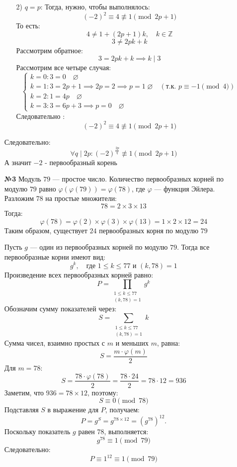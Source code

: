 \documentclass[a4paper]{article}
\renewcommand{\f}[2]{\frac{#1}{#2}}
\newcommand{\case}[1]{\begin{cases} #1 \end{cases}}
\renewcommand{\phi}{\varphi}
\renewcommand{\leq}{\leqslant}
\newcommand{\ZZ}{\mathbb{Z}}
\newcommand{\divides}{\;|\;}
\begin{document}
\begin{enumerate}
\begin{enumerate}
        \item[2)] $q = p$:
        Тогда, нужно, чтобы выполнялось:
        $$(-2)^{2} \equiv 4 \not \equiv 1 \pmod{2p+1}$$
        То есть:
        $$4\neq 1 + (2p+1)k, \quad k \in \ZZ$$
        $$3 \neq 2pk+k$$
        Рассмотрим обратное:
        $$3= 2pk+k \implies k \divides 3$$
        Рассмотрим все четыре случая:
        $$\case{
            k = 0: 3= 0 \quad \varnothing\\
            k = 1: 3 = 2p+1 \implies 2p = 2 \implies p = 1\; \varnothing \quad (\text{т.к. } p \equiv -1 \pmod{4}) \\
            k = 2: 1 = 4p \quad \varnothing\\
            k = 3: 3 = 6p+3 \implies p = 0 \quad \varnothing
        }$$
        Следовательно :
        $$(-2)^{2} \equiv 4 \not \equiv 1 \pmod{2p+1}$$
    \end{enumerate}
    Следовательно:
    $$\forall q \divides 2p : (-2)^{\f{2p}{q}} \not\equiv 1 \pmod{2p+1}$$
    А значит $-2$ - первообразный корень

    \item[\textbf{№3}]Модуль \( 79 \) — простое число. Количество первообразных корней по модулю \( 79 \) равно \( \phi(\phi(79)) = \phi(78) \), где \( \phi \) — функция Эйлера. Разложим \( 78 \) на простые множители:
    \[
    78 = 2 \times 3 \times 13
    \]
    Тогда:
    \[
    \phi(78) = \phi(2) \times \phi(3) \times \phi(13) = 1 \times 2 \times 12 = 24
    \]
    Таким образом, существует \( 24 \) первообразных корня по модулю \( 79 \)
    
    Пусть \( g \) — один из первообразных корней по модулю \( 79 \). Тогда все первообразные корни имеют вид:
    \[
    g^k, \quad \text{где } 1 \leq k \leq 77 \text{ и } (k, 78) = 1
    \]
    Произведение всех первообразных корней равно:
    \[
    P = \prod_{\substack{1 \leq k \leq 77 \\ (k, 78) = 1}} g^k
    \]
    Обозначим сумму показателей через:
    \[
    S = \sum_{\substack{1 \leq k \leq 77 \\ (k, 78) = 1}} k
    \]
    Сумма чисел, взаимно простых с \( m \) и меньших \( m \), равна:
    \[
    S = \frac{m \cdot \phi(m)}{2}
    \]
    Для \( m = 78 \):
    \[
    S = \frac{78 \cdot \phi(78)}{2} = \frac{78 \cdot 24}{2} = 78 \cdot 12 = 936
    \]
    Заметим, что \( 936 = 78 \times 12 \), поэтому:
    \[
    S \equiv 0 \pmod{78}
    \]
    Подставляя \( S \) в выражение для \( P \), получаем:
    \[
    P = g^{S} = g^{78 \times 12} = \left(g^{78}\right)^{12}.
    \]
    Поскольку показатель \( g \) равен \( 78 \), выполняется:
    \[
    g^{78} \equiv 1 \pmod{79}
    \]
    Следовательно:
    \[
    P \equiv 1^{12} \equiv 1 \pmod{79}
    \]\\


\end{enumerate}
\end{document}
